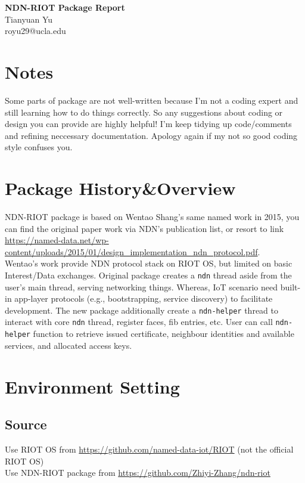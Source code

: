 \documentclass[a4paper, 11pt]{article}
\begin{document}
        \noindent
        \large\textbf{NDN-RIOT Package Report} \\ 
        \normalsize Tianyuan Yu \\ royu29@ucla.edu
        
        \section*{Notes}
        Some parts of package are not well-written because I'm not a coding expert and still learning how to do things correctly. So any suggestions about coding or design you can provide are highly helpful! I'm keep tidying up code/comments and refining neccessary documentation. Apology again if my not so good coding style confuses you.

        \section*{Package History\&Overview}
        NDN-RIOT package is based on Wentao Shang's same named work in 2015, you can find the original paper work via NDN's publication list, or resort to link \url{https://named-data.net/wp-content/uploads/2015/01/design_implementation_ndn_protocol.pdf}.\\ Wentao's work provide NDN protocol stack on RIOT OS, but limited on basic Interest/Data exchanges. Original package creates a \texttt{ndn} thread aside from the user's main thread, serving networking things. Whereas, IoT scenario need built-in app-layer protocols (e.g., bootstrapping, service discovery) to facilitate development. The new package additionally create a \texttt{ndn-helper} thread to interact with core \texttt{ndn} thread, register faces, fib entries, etc. User can call \texttt{ndn-helper} function to retrieve issued certificate, neighbour identities and available services, and allocated access keys.
        
        \section*{Environment Setting}
        \subsection*{Source}
        Use RIOT OS from \url{https://github.com/named-data-iot/RIOT} (not the official RIOT OS)\\
        Use NDN-RIOT package from \url{https://github.com/Zhiyi-Zhang/ndn-riot}
\end{document}
